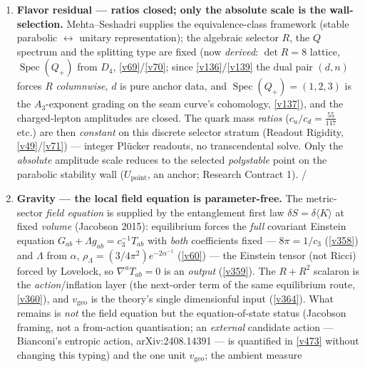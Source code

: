 \documentclass[11pt,a4paper]{article}
\newcommand{\cthree}{c_3}
\begin{document}
\begin{gapboxnb}
\begin{enumerate}[leftmargin=1.6em,itemsep=2pt,topsep=2pt]
\item \textbf{Flavor residual --- ratios closed; only the absolute scale is the wall-selection.}
      Mehta--Seshadri supplies the equivalence-class framework (stable parabolic $\leftrightarrow$ unitary
      representation); the algebraic selector $R$, the $Q$ spectrum and the splitting type are fixed (now
      \emph{derived}: $\det R=8$ lattice, $\operatorname{Spec}(Q_+)$ from $D_4$, \vref{v69}/\vref{v70}; since
      \vref{v136}/\vref{v139} the dual pair $(d,n)$ forces $R$ \emph{columnwise}, $d$ is pure anchor data, and
      $\operatorname{Spec}(Q_+)=(1,2,3)$ is the $A_3$-exponent grading on the seam curve's cohomology,
      \vref{v137}), and the charged-lepton amplitudes are closed. The quark mass \emph{ratios}
      ($c_u/c_d=\tfrac{55}{117}$ etc.) are
      then \emph{constant} on this discrete selector stratum (Readout Rigidity, \vref{v49}/\vref{v71}) --- integer Pl\"ucker
      readouts, no transcendental solve. Only the \emph{absolute} amplitude scale reduces to the selected
      \emph{polystable} point on the parabolic stability wall ($U_{\mathrm{point}}$, an anchor; Research
      Contract 1). \mE/\mO
\item \textbf{Gravity --- the local field equation is parameter-free.} The metric-sector \emph{field
      equation} is supplied by the entanglement first law $\delta S=\delta\langle K\rangle$ at fixed
      \emph{volume} (Jacobson 2015): equilibrium forces the \emph{full} covariant Einstein equation
      $G_{ab}{+}\Lambda g_{ab}=\cthree^{-1}T_{ab}$ with \emph{both} coefficients fixed --- $8\pi{=}1/\cthree$
      (\vref{v358}) and $\Lambda$ from $\alpha$, $\rho_\Lambda{=}(3/4\pi^2)e^{-2\alpha^{-1}}$ (\vref{v60}) ---
      the Einstein tensor (not Ricci) forced by Lovelock, so $\nabla^aT_{ab}{=}0$ is an \emph{output}
      (\vref{v359}). The $R{+}R^2$ scalaron is the \emph{action}/inflation layer (the next-order term of the
      same equilibrium route, \vref{v360}), and $v_{\mathrm{geo}}$ is the theory's single dimensionful input
      (\vref{v364}). What remains is \emph{not} the field equation but the equation-of-state status (Jacobson
      framing, not a from-action quantisation; an \emph{external} candidate action --- Bianconi's entropic
      action, arXiv:2408.14391 --- is quantified in \vref{v473} without changing this typing) and the one
      unit $v_{\mathrm{geo}}$; the ambient measure

\end{enumerate}
\end{gapboxnb}
\end{document}
